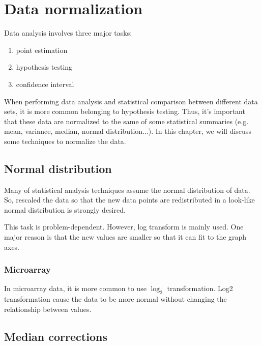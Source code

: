 
\chapter{Data normalization}
\label{chap:data-normalization}

Data analysis involves three major tasks:
\begin{enumerate}
\item point estimation

\item hypothesis testing

\item confidence interval
\end{enumerate}


When performing data analysis and statistical comparison between
different data sets, it is more common belonging to hypothesis
testing. Thus, it's important that these data are normalized to the
same of some statistical summaries (e.g. mean, variance, median,
normal distribution...). In this chapter, we will discuss some
techniques to normalize the data.

\section{Normal distribution}
\label{sec:normal-distribution}

Many of statistical analysis techniques assume the normal distribution
of data. So, rescaled the data so that the new data points are
redistributed in a look-like normal distribution is strongly desired. 

This task is problem-dependent. However, log transform is mainly
used. One major reason is that the new values are smaller so that it
can fit to the graph axes. 

\subsection{Microarray}
\label{sec:microarray}


In microarray data, it is more common to use $\log_2$
transformation. Log2 transformation cause the data to be more normal
without changing the relationship between values. 


\section{Median corrections}
\label{sec:median-corrections}


